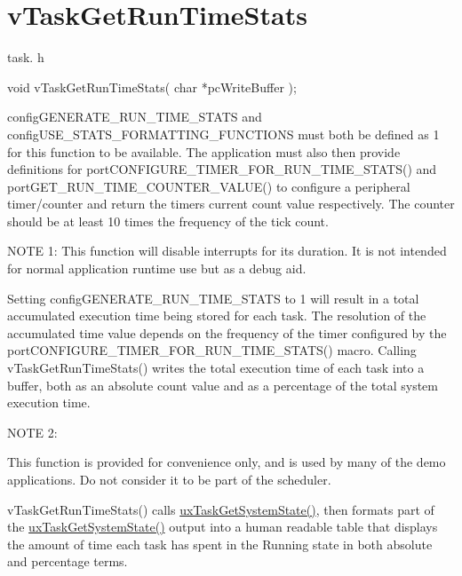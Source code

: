 \hypertarget{group__v_task_get_run_time_stats}{}\section{v\+Task\+Get\+Run\+Time\+Stats}
\label{group__v_task_get_run_time_stats}
task. h 
\begin{DoxyPre}void vTaskGetRunTimeStats( char *pcWriteBuffer );\end{DoxyPre}


config\+G\+E\+N\+E\+R\+A\+T\+E\+\_\+\+R\+U\+N\+\_\+\+T\+I\+M\+E\+\_\+\+S\+T\+A\+TS and config\+U\+S\+E\+\_\+\+S\+T\+A\+T\+S\+\_\+\+F\+O\+R\+M\+A\+T\+T\+I\+N\+G\+\_\+\+F\+U\+N\+C\+T\+I\+O\+NS must both be defined as 1 for this function to be available. The application must also then provide definitions for port\+C\+O\+N\+F\+I\+G\+U\+R\+E\+\_\+\+T\+I\+M\+E\+R\+\_\+\+F\+O\+R\+\_\+\+R\+U\+N\+\_\+\+T\+I\+M\+E\+\_\+\+S\+T\+A\+T\+S() and port\+G\+E\+T\+\_\+\+R\+U\+N\+\_\+\+T\+I\+M\+E\+\_\+\+C\+O\+U\+N\+T\+E\+R\+\_\+\+V\+A\+L\+U\+E() to configure a peripheral timer/counter and return the timers current count value respectively. The counter should be at least 10 times the frequency of the tick count.

N\+O\+TE 1\+: This function will disable interrupts for its duration. It is not intended for normal application runtime use but as a debug aid.

Setting config\+G\+E\+N\+E\+R\+A\+T\+E\+\_\+\+R\+U\+N\+\_\+\+T\+I\+M\+E\+\_\+\+S\+T\+A\+TS to 1 will result in a total accumulated execution time being stored for each task. The resolution of the accumulated time value depends on the frequency of the timer configured by the port\+C\+O\+N\+F\+I\+G\+U\+R\+E\+\_\+\+T\+I\+M\+E\+R\+\_\+\+F\+O\+R\+\_\+\+R\+U\+N\+\_\+\+T\+I\+M\+E\+\_\+\+S\+T\+A\+T\+S() macro. Calling v\+Task\+Get\+Run\+Time\+Stats() writes the total execution time of each task into a buffer, both as an absolute count value and as a percentage of the total system execution time.

N\+O\+TE 2\+:

This function is provided for convenience only, and is used by many of the demo applications. Do not consider it to be part of the scheduler.

v\+Task\+Get\+Run\+Time\+Stats() calls \hyperlink{group___tasks_gaa4603f3de3d809e9beb18d10fbac005d}{ux\+Task\+Get\+System\+State()}, then formats part of the \hyperlink{group___tasks_gaa4603f3de3d809e9beb18d10fbac005d}{ux\+Task\+Get\+System\+State()} output into a human readable table that displays the amount of time each task has spent in the Running state in both absolute and percentage terms.

